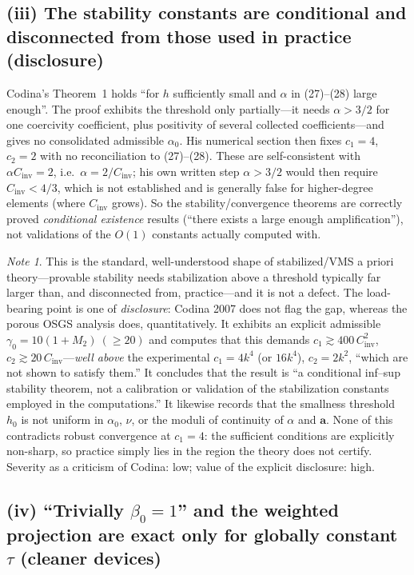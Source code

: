 \documentclass[11pt]{article}
\theoremstyle{remark}
\newtheorem*{note}{Note}
\newcommand{\ba}{\boldsymbol{a}}
\begin{document}
\subsection*{(iii) The stability constants are conditional and disconnected from those used in practice (disclosure)}

Codina's Theorem~1 holds ``for $h$ sufficiently small and $\alpha$ in (27)--(28) large
enough''. The proof exhibits the threshold only partially---it needs $\alpha>3/2$ for one
coercivity coefficient, plus positivity of several collected coefficients---and gives no
consolidated admissible $\alpha_0$. His numerical section then fixes $c_1=4$, $c_2=2$ with no
reconciliation to (27)--(28). These are self-consistent with $\alpha C_{\mathrm{inv}}=2$, i.e.\
$\alpha=2/C_{\mathrm{inv}}$; his own written step $\alpha>3/2$ would then require
$C_{\mathrm{inv}}<4/3$, which is not established and is generally false for higher-degree
elements (where $C_{\mathrm{inv}}$ grows). So the stability/convergence theorems are correctly
proved \emph{conditional existence} results (``there exists a large enough amplification''),
not validations of the $O(1)$ constants actually computed with.

\begin{note}
This is the standard, well-understood shape of stabilized/VMS a priori theory---provable
stability needs stabilization above a threshold typically far larger than, and disconnected
from, practice---and it is not a defect. The load-bearing point is one of \emph{disclosure}:
Codina 2007 does not flag the gap, whereas the porous OSGS analysis does, quantitatively. It
exhibits an explicit admissible $\gamma_0=10(1+M_2)\ (\ge20)$ and computes that this demands
$c_1\gtrsim400\,C_{\mathrm{inv}}^2$, $c_2\gtrsim20\,C_{\mathrm{inv}}$---\emph{well above} the
experimental $c_1=4k^4$ (or $16k^4$), $c_2=2k^2$, ``which are not shown to satisfy them.'' It
concludes that the result is ``a conditional inf--sup stability theorem, not a calibration or
validation of the stabilization constants employed in the computations.'' It likewise records that the
smallness threshold $h_0$ is not uniform in $\alpha_0$, $\nu$, or the moduli of continuity of
$\alpha$ and $\ba$. None of this contradicts robust convergence at $c_1=4$: the sufficient
conditions are explicitly non-sharp, so practice simply lies in the region the theory does not
certify. Severity as a criticism of Codina: low; value of the explicit disclosure: high.
\end{note}

\subsection*{(iv) ``Trivially \texorpdfstring{$\beta_0=1$}{beta0=1}'' and the weighted projection are exact only for globally constant \texorpdfstring{$\tau$}{tau} (cleaner devices)}
\end{document}
